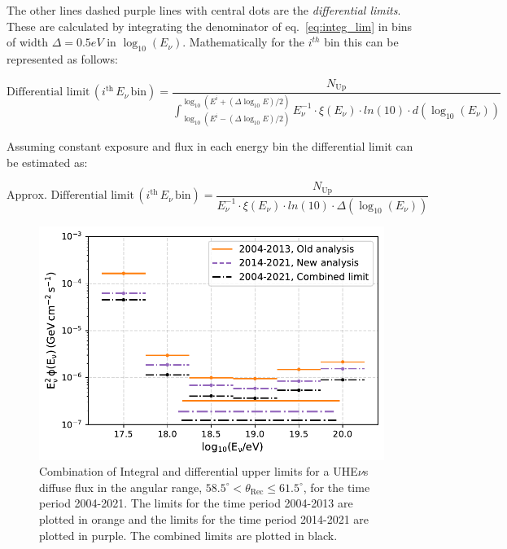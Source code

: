 The other lines dashed purple lines with central dots are the \textit{differential limits}. These are calculated by integrating the denominator of eq.~\ref{eq:integ_lim} in bins of width $\Delta = 0.5eV$ in $\log_{10}(E_{\nu})$. Mathematically for the $i^{th}$ bin this can be represented as follows:

\begin{equation}
  \label{eq:diff_lim}
  \text{Differential limit} \, (i^{\text{th}} \, E_{\nu} \, \text{bin})  = \frac{N_{\text{Up}}}{\int_{\log_{10}(E^i - (\Delta \log_{10}E)/2)}^{\log_{10}(E^i + (\Delta \log_{10}E)/2)} E^{-1}_{\nu} \cdot \xi(E_{\nu}) \cdot ln(10) \cdot d(\log_{10}(E_{\nu}))}
\end{equation}

Assuming constant exposure and flux in each energy bin the differential limit can be estimated as:

\begin{equation}
  \label{eq:diff_lim_approx}
 \text{Approx. Differential limit} \, (i^{\text{th}} \, E_{\nu} \, \text{bin})  = \frac{N_{\text{Up}}}{E^{-1}_{\nu} \cdot \xi(E_{\nu}) \cdot ln(10) \cdot \Delta (\log_{10}(E_{\nu}))}
\end{equation}
\begin{figure}[t!]
  \centering
  \includegraphics[width=14.5cm]{thesis_figures/ExpLimits/Integ_DiffLimit_comp_combined_new_sim_optim.pdf}
  \caption{Combination of Integral and differential upper limits for a UHE$\nu$s diffuse flux in the angular range, $ 58.5^{\circ} <\theta_{\text{Rec}} \leq 61.5^{\circ}$, for the time period 2004-2021. The limits for the time period 2004-2013 are plotted in orange and the limits for the time period 2014-2021 are plotted in purple. The combined limits are plotted in black.}
  \label{fig:Limit_comp_2}
\end{figure}

